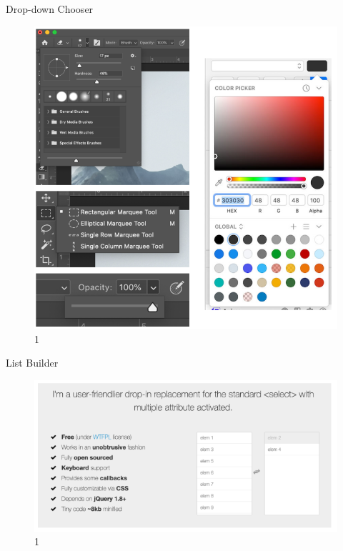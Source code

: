 \documentclass{beamer}
\begin{document}
\begin{frame}[t]{Drop-down Chooser}
	\begin{figure}[h]
		\centering
		\includegraphics[scale=0.6]{images/lec08-pic57.png}
		\caption{1}
	\end{figure}
\end{frame}

\begin{frame}[t]{List Builder}
	\begin{figure}[h]
		\centering
		\includegraphics[scale=0.6]{images/lec08-pic58.png}
		\caption{1}
	\end{figure}
\end{frame}
\end{document}
